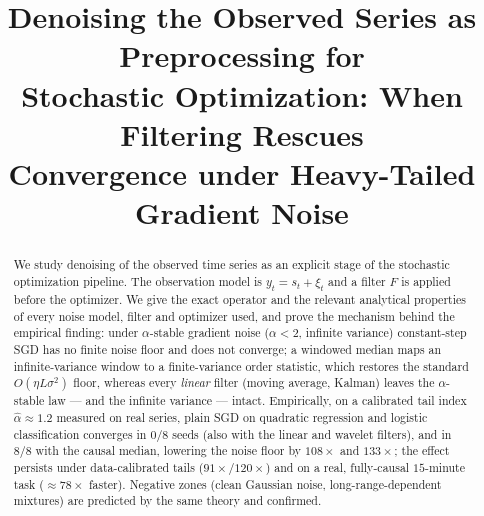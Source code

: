 \documentclass[conference]{IEEEtran}
\begin{document}
\title{Denoising the Observed Series as Preprocessing for\\
Stochastic Optimization: When Filtering Rescues\\
Convergence under Heavy-Tailed Gradient Noise}

\author{%
\and
{}
\and
{}
\and
{}
}

\maketitle

\begin{abstract}
We study denoising of the observed time series as an explicit stage of
the stochastic optimization pipeline. The observation model is
$y_t=s_t+\xi_t$ and a filter $F$ is applied before the optimizer. We give
the exact operator and the relevant analytical properties of every
noise model, filter and optimizer used, and prove the mechanism behind
the empirical finding: under $\alpha$-stable gradient noise
($\alpha<2$, infinite variance) constant-step SGD has no finite noise
floor and does not converge; a windowed median maps an
infinite-variance window to a finite-variance order statistic, which
restores the standard $O(\eta L\sigma^2)$ floor, whereas every
\emph{linear} filter (moving average, Kalman) leaves the
$\alpha$-stable law --- and the infinite variance --- intact. Empirically,
on a calibrated tail index $\hat\alpha\approx1.2$ measured on real
series, plain SGD on quadratic regression and logistic classification
converges in $0/8$ seeds (also with the linear and wavelet filters),
and in $8/8$ with the causal median, lowering the noise floor by
$108\times$ and $133\times$; the effect persists under
data-calibrated tails ($91\times$/$120\times$) and on a real,
fully-causal $15$-minute task ($\approx78\times$ faster). Negative
zones (clean Gaussian noise, long-range-dependent mixtures) are
predicted by the same theory and confirmed.
\end{abstract}
\end{document}
